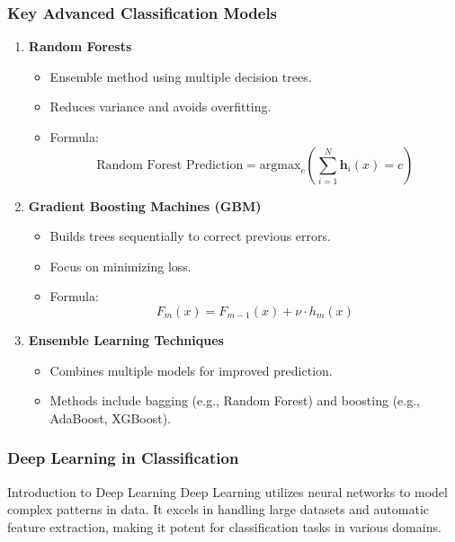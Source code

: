 \documentclass[aspectratio=169]{beamer}
\begin{document}
\begin{frame}[fragile]
    \frametitle{Key Advanced Classification Models}
    \begin{enumerate}
        \item \textbf{Random Forests}
            \begin{itemize}
                \item Ensemble method using multiple decision trees.
                \item Reduces variance and avoids overfitting.
                \item Formula: 
                \begin{equation}
                \text{Random Forest Prediction} = \text{argmax}_{c} \left(\sum_{i=1}^{N} \mathbf{h}_i(x) = c\right)
                \end{equation}
            \end{itemize}
    
        \item \textbf{Gradient Boosting Machines (GBM)}
            \begin{itemize}
                \item Builds trees sequentially to correct previous errors.
                \item Focus on minimizing loss.
                \item Formula: 
                \begin{equation}
                F_{m}(x) = F_{m-1}(x) + \nu \cdot h_{m}(x)
                \end{equation}
            \end{itemize}
    
        \item \textbf{Ensemble Learning Techniques}
            \begin{itemize}
                \item Combines multiple models for improved prediction.
                \item Methods include bagging (e.g., Random Forest) and boosting (e.g., AdaBoost, XGBoost).
            \end{itemize}
    \end{enumerate}
\end{frame}

\begin{frame}[fragile]
    \frametitle{Deep Learning in Classification}
    \begin{block}{Introduction to Deep Learning}
        Deep Learning utilizes neural networks to model complex patterns in data. 
        It excels in handling large datasets and automatic feature extraction, making it potent for classification tasks in various domains.
    \end{block}
\end{frame}
\end{document}
